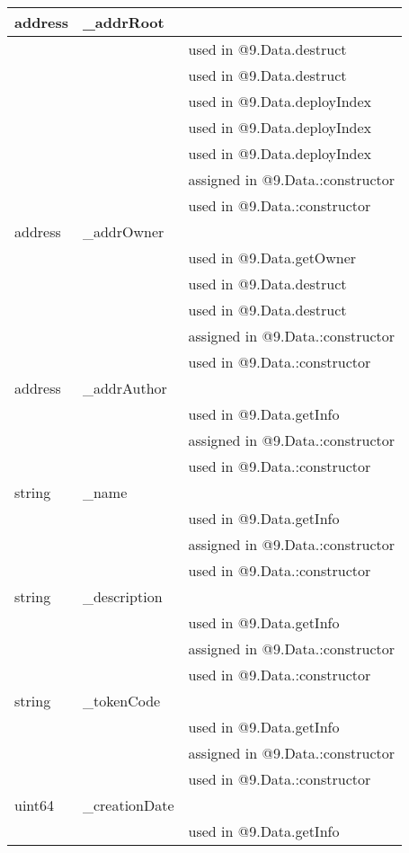 \ifsoltables
\noindent\begin{tabular}{|l|l|p{5cm}|}\hline
address & \_{}addrRoot &  \\\hline
 & & used in @9.Data.destruct\\\hline
 & & used in @9.Data.destruct\\\hline
 & & used in @9.Data.deployIndex\\\hline
 & & used in @9.Data.deployIndex\\\hline
 & & used in @9.Data.deployIndex\\\hline
 & & assigned in @9.Data.:constructor\\\hline
 & & used in @9.Data.:constructor\\\hline
address & \_{}addrOwner &  \\\hline
 & & used in @9.Data.getOwner\\\hline
 & & used in @9.Data.destruct\\\hline
 & & used in @9.Data.destruct\\\hline
 & & assigned in @9.Data.:constructor\\\hline
 & & used in @9.Data.:constructor\\\hline
address & \_{}addrAuthor &  \\\hline
 & & used in @9.Data.getInfo\\\hline
 & & assigned in @9.Data.:constructor\\\hline
 & & used in @9.Data.:constructor\\\hline
string & \_{}name &  \\\hline
 & & used in @9.Data.getInfo\\\hline
 & & assigned in @9.Data.:constructor\\\hline
 & & used in @9.Data.:constructor\\\hline
string & \_{}description &  \\\hline
 & & used in @9.Data.getInfo\\\hline
 & & assigned in @9.Data.:constructor\\\hline
 & & used in @9.Data.:constructor\\\hline
string & \_{}tokenCode &  \\\hline
 & & used in @9.Data.getInfo\\\hline
 & & assigned in @9.Data.:constructor\\\hline
 & & used in @9.Data.:constructor\\\hline
uint64 & \_{}creationDate &  \\\hline
 & & used in @9.Data.getInfo\\\hline

\end{tabular}
